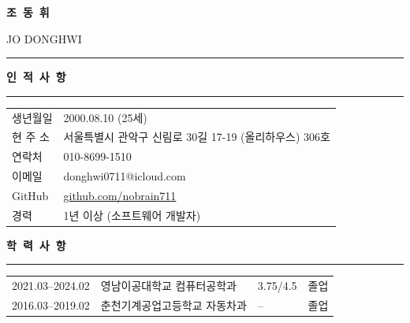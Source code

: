 \documentclass[a4paper, 10pt]{article}
\newcommand{\resumesection}[1]{%
  \vspace{8pt}
  \noindent
  {\large\bfseries #1}
  \vspace{2pt}
  \noindent\hrule
  \vspace{4pt}
}
\begin{document}

\begin{minipage}[t]{\textwidth}
  \vspace{0pt}
  {\fontsize{32}{32}\selectfont\textbf{조\ 동\ 휘}}

  \vspace{2pt}

  {\large JO DONGHWI}

  \vspace{4pt}
  \noindent\hrule
  \vspace{6pt}
\end{minipage}


\resumesection{인\ 적\ 사\ 항}

\begin{tabularx}{\textwidth}{l X}
  생년월일 & 2000.08.10 (25세) \\
  현 주 소 & 서울특별시 관악구 신림로 30길 17-19 (올리하우스) 306호 \\
  연락처 & 010-8699-1510 \\
  이메일 & donghwi0711@icloud.com \\
  GitHub & \href{https://github.com/nobrain711}{github.com/nobrain711} \\
  경력 & 1년 이상 (소프트웨어 개발자) \\
\end{tabularx}


\resumesection{학\ 력\ 사\ 항}

\noindent
\begin{tabularx}{\textwidth}{l X l l}
  2021.03--2024.02 & 영남이공대학교 컴퓨터공학과 & 3.75/4.5 & 졸업 \\
  2016.03--2019.02 & 춘천기계공업고등학교 자동차과 & -- & 졸업 \\
\end{tabularx}

\end{document}
